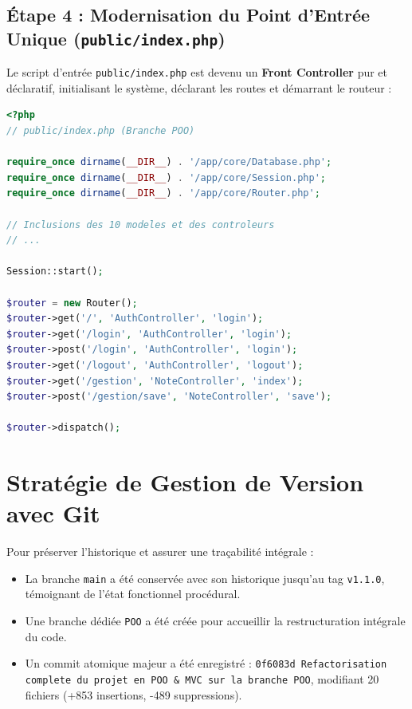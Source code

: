 \documentclass[11pt,a4paper,oneside]{report}
\begin{document}
\subsection{Étape 4 : Modernisation du Point d'Entrée Unique (\texttt{public/index.php})}
Le script d'entrée \texttt{public/index.php} est devenu un \textbf{Front Controller} pur et déclaratif, initialisant le système, déclarant les routes et démarrant le routeur :

\begin{lstlisting}[language=PHP, caption={Front Controller déclaratif en POO}]
<?php
// public/index.php (Branche POO)

require_once dirname(__DIR__) . '/app/core/Database.php';
require_once dirname(__DIR__) . '/app/core/Session.php';
require_once dirname(__DIR__) . '/app/core/Router.php';

// Inclusions des 10 modeles et des controleurs
// ...

Session::start();

$router = new Router();
$router->get('/', 'AuthController', 'login');
$router->get('/login', 'AuthController', 'login');
$router->post('/login', 'AuthController', 'login');
$router->get('/logout', 'AuthController', 'logout');
$router->get('/gestion', 'NoteController', 'index');
$router->post('/gestion/save', 'NoteController', 'save');

$router->dispatch();
\end{lstlisting}

\section{Stratégie de Gestion de Version avec Git}

Pour préserver l'historique et assurer une traçabilité intégrale :
\begin{itemize}[label=\textcolor{primaryMed}{\textbullet}]
    \item La branche \texttt{main} a été conservée avec son historique jusqu'au tag \texttt{v1.1.0}, témoignant de l'état fonctionnel procédural.
    \item Une branche dédiée \texttt{POO} a été créée pour accueillir la restructuration intégrale du code.
    \item Un commit atomique majeur a été enregistré : \texttt{0f6083d Refactorisation complete du projet en POO \& MVC sur la branche POO}, modifiant 20 fichiers (+853 insertions, -489 suppressions).
\end{itemize}
\end{document}
